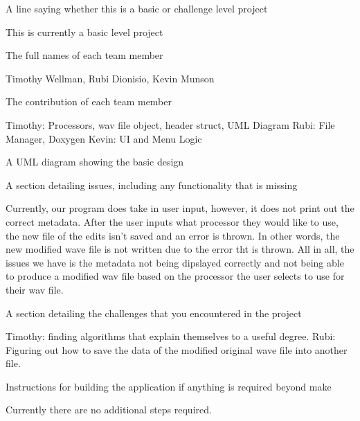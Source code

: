 A line saying whether this is a basic or challenge level project \begin{DoxyVerb}This is currently a basic level project
\end{DoxyVerb}


The full names of each team member \begin{DoxyVerb}Timothy Wellman, Rubi Dionisio, Kevin Munson
\end{DoxyVerb}


The contribution of each team member \begin{DoxyVerb}Timothy: Processors, wav file object, header struct, UML Diagram
Rubi: File Manager, Doxygen
Kevin: UI and Menu Logic
\end{DoxyVerb}


A U\+ML diagram showing the basic design



A section detailing issues, including any functionality that is missing \begin{DoxyVerb}Currently, our program does take in user input, however, it does not print out the correct metadata.
After the user inputs what processor they would like to use, the new file of the edits isn't saved and an error is thrown.
In other words, the new modified wave file is not written due to the error tht is thrown.
All in all, the issues we have is the metadata not being dipslayed correctly and not being able to produce a modified wav file based on the processor the user selects to use for their wav file.
\end{DoxyVerb}


A section detailing the challenges that you encountered in the project \begin{DoxyVerb}Timothy: finding algorithms that explain themselves to a useful degree.
Rubi: Figuring out how to save the data of the modified original wave file into another file.
\end{DoxyVerb}


Instructions for building the application if anything is required beyond make \begin{DoxyVerb}Currently there are no additional steps required.
\end{DoxyVerb}
 